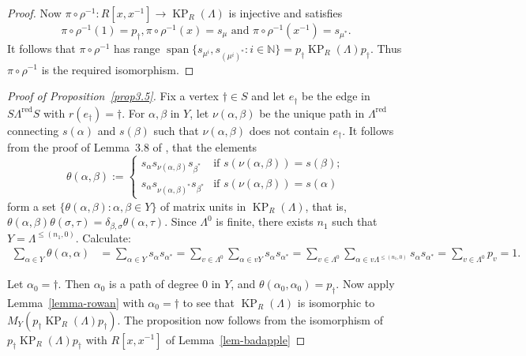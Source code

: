\documentclass[a4paper,12pt]{amsart}
\numberwithin{equation}{section}
\theoremstyle{definition}
\theoremstyle{remark}
\begin{document}
\begin{proof}
Now $\pi\circ\rho^{-1}:R[x,x^{-1}]\to \operatorname{KP}_R(\Lambda)$ is injective and satisfies 
\[\pi\circ\rho^{-1}(1)=p_\dagger, \pi\circ\rho^{-1}(x)=s_\mu \text{ and } \pi\circ\rho^{-1}(x^{-1})=s_{\mu^*}.\] It follows that $\pi\circ\rho^{-1}$ has range ${\operatorname{\mathrm{span}}}\{s_{\mu^i}, s_{(\mu^i)^*}:i\in{\mathbb{N}}\}=p_{\dagger}\operatorname{KP}_R(\Lambda)p_{\dagger}$. Thus $\pi\circ\rho^{-1}$ is the required isomorphism. 
\end{proof}

\begin{proof}[Proof of Proposition~\ref{prop3.5}]  Fix a vertex $\dagger\in S$ and 
let $e_\dagger$ be the edge in $S\Lambda^{{\operatorname{\mathrm{red}}}} S$ with $r(e_\dagger)=\dagger$.  For $\alpha,\beta$ in $Y$, let $\nu(\alpha,\beta)$ be the unique path in $\Lambda^{{\operatorname{\mathrm{red}}}}$ connecting $s(\alpha)$ and $s(\beta)$ such that $\nu(\alpha,\beta)$ does not contain $e_\dagger$. 
It follows from the proof of Lemma~3.8 of \cite{PRRS}, that the elements
 \begin{equation}\label{matrixunits}
 \theta(\alpha,\beta):=\begin{cases}s_\alpha s_{\nu(\alpha,\beta)}s_{\beta^*}  
 &\text{if $s(\nu(\alpha,\beta))=s(\beta)$};\\
 s_\alpha s_{\nu(\alpha,\beta)^*}s_{\beta^*}  &\text{if $s(\nu(\alpha,\beta))=s(\alpha)$}
 \end{cases}
 \end{equation}
form a set $\{\theta(\alpha,\beta):\alpha,\beta\in Y\}$ of matrix units in $\operatorname{KP}_R(\Lambda)$, that is, $\theta(\alpha,\beta)\theta(\sigma,\tau)=\delta_{\beta, \sigma}\theta(\alpha,\tau)$. Since $\Lambda^0$ is finite, there exists $n_1$ such that $Y=\Lambda^{\leq (n_1,0)}$. Calculate:
\begin{align*}\sum_{\alpha\in Y} \theta(\alpha,\alpha)&=\sum_{\alpha\in Y} s_\alpha s_{\alpha^*}=\sum_{v\in\Lambda^0}\sum_{\alpha\in vY}s_\alpha s_{\alpha^*}
=\sum_{v\in\Lambda^0}\sum_{\alpha\in v\Lambda^{\leq (n_1,0)}}s_\alpha s_{\alpha^*}=\sum_{v\in\Lambda^0}p_v=1.
\end{align*}

Let $\alpha_0=\dagger$. Then $\alpha_0$ is a path of degree $0$ in $Y$, and $\theta(\alpha_0,\alpha_0)=p_\dagger$.
Now apply Lemma~\ref{lemma-rowan} with $\alpha_0=\dagger$  to see that $\operatorname{KP}_R(\Lambda)$ is isomorphic to $M_Y(p_\dagger\operatorname{KP}_R(\Lambda)p_\dagger)$.  The proposition now follows from the isomorphism of $p_\dagger\operatorname{KP}_R(\Lambda)p_\dagger$ with $R[x,x^{-1}]$ of Lemma~\ref{lem-badapple}
\end{proof}
\end{document}
